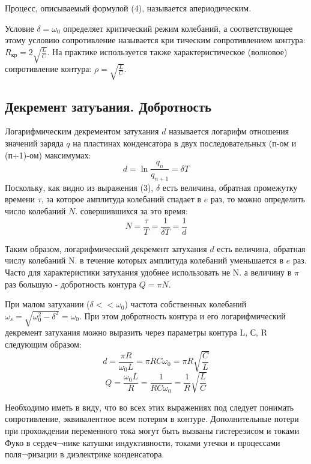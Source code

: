 Процесс, описываемый формулой (4), называется апериодическим.


Условие $\delta=\omega_0$ определяет критический режим колебаний, а соответствующее этому условию сопротивление называется кри 
тическим сопротивлением контура: $R_{\text{кр}}=2\sqrt{\frac{L}{C}}$. На практике используется также характеристическое (волновое) сопротивление 
контура: $\rho=\sqrt{\frac{L}{C}}$.

\subsection{Декремент затуъания. Добротность}
Логарифмическим декрементом затухания $d$ называется логарифм отношения значений заряда $q$ на пластинах конденсатора в двух последовательных (п-ом и (п+1)-ом) максимумах:
\begin{equation}
	d=\ln{\frac{q_n}{q_{n+1}}}=\delta T
\end{equation}
Поскольку, как видно из выражения (3), $\delta$ есть величина, обратная промежутку времени $\tau$, за которое амплитуда колебаний спадает в $e$ раз, то можно определить число колебаний $N$. совершившихся за это время:
\begin{equation}
	N=\frac{\tau}{T}=
		\frac{1}{\delta T}=
			\frac{1}{d}
\end{equation}

Таким образом, логарифмический декремент затухания $d$ есть величина, обратная числу колебаний N. в течение которых амплитуда колебаний уменьшается в $e$ раз.
Часто для характеристики затухания удобнее использовать не N. а величину в $\pi$ раз большую - добротность контура $Q=\pi N$.
 
При малом затухании ($\delta<<\omega_0$) частота собственных колебаний 
$\omega_s=\sqrt{\omega_0^2 - \delta^2}=\omega_0$. 
При этом добротность контура и его
логарифмический декремент затухания можно выразить через параметры контура L, С, R следующим образом:
\begin{equation}
	d=\frac{\pi R}{\omega_0 L}=\pi RC\omega_0=\pi R\sqrt{\frac{C}{L}}
\end{equation}
\begin{equation}
	Q=\frac{\omega_0 L}{R}=\frac{1}{RC\omega_0}=\frac{1}{R}\sqrt{\frac{L}{C}}
\end{equation}

Необходимо иметь в виду, что во всех этих выражениях под следует понимать сопротивление, эквивалентное всем потерям в контуре. Дополнительные потери при прохождении переменного тока могут быть вызваны гистерезисом и токами Фуко в сердеч¬нике катушки индуктивности, токами утечки и процессами поля¬ризации в диэлектрике конденсатора.
